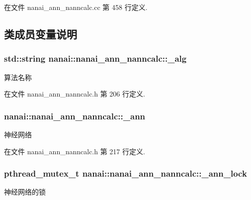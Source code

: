 在文件 nanai\+\_\+ann\+\_\+nanncalc.\+cc 第 458 行定义.



\subsection{类成员变量说明}
\hypertarget{classnanai_1_1nanai__ann__nanncalc_a66ab62c75be9da3951abd85e1eb296e0}{}
\subsubsection[{\+\_\+alg}]{\setlength{\rightskip}{0pt plus 5cm}std\+::string nanai\+::nanai\+\_\+ann\+\_\+nanncalc\+::\+\_\+alg\hspace{0.3cm}{\ttfamily [protected]}}\label{classnanai_1_1nanai__ann__nanncalc_a66ab62c75be9da3951abd85e1eb296e0}
算法名称 

在文件 nanai\+\_\+ann\+\_\+nanncalc.\+h 第 206 行定义.

\hypertarget{classnanai_1_1nanai__ann__nanncalc_a3b0bfac7c99ef9d83769efd2936e4638}{}
\subsubsection[{\+\_\+ann}]{ nanai\+::nanai\+\_\+ann\+\_\+nanncalc\+::\+\_\+ann\hspace{0.3cm}{\ttfamily [protected]}}\label{classnanai_1_1nanai__ann__nanncalc_a3b0bfac7c99ef9d83769efd2936e4638}
神经网络 

在文件 nanai\+\_\+ann\+\_\+nanncalc.\+h 第 217 行定义.

\hypertarget{classnanai_1_1nanai__ann__nanncalc_ab05880760848bb308d30833b362f60a8}{}
\subsubsection[{\+\_\+ann\+\_\+lock}]{\setlength{\rightskip}{0pt plus 5cm}pthread\+\_\+mutex\+\_\+t nanai\+::nanai\+\_\+ann\+\_\+nanncalc\+::\+\_\+ann\+\_\+lock\hspace{0.3cm}{\ttfamily [protected]}}\label{classnanai_1_1nanai__ann__nanncalc_ab05880760848bb308d30833b362f60a8}
神经网络的锁 

